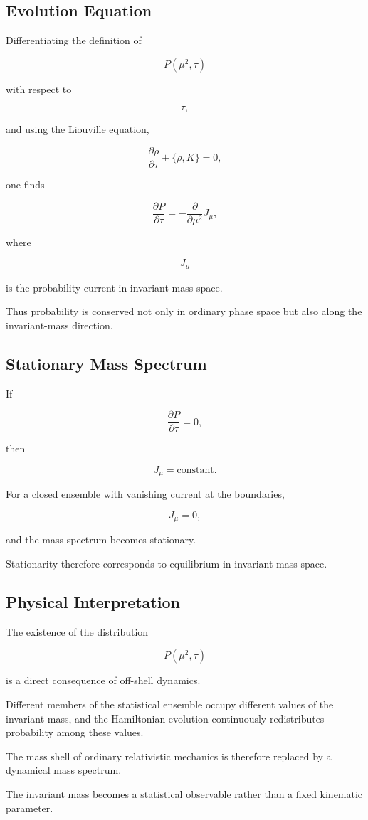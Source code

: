 \subsection{Evolution Equation}

Differentiating the definition of

\[
P(\mu^2,\tau)
\]

with respect to

\[
\tau,
\]

and using the Liouville equation,

\[
\frac{\partial\rho}{\partial\tau}
+
\{\rho,K\}
=
0,
\]

one finds

\[
\frac{\partial P}{\partial\tau}
=
-
\frac{\partial}{\partial\mu^2}
J_\mu,
\]

where

\[
J_\mu
\]

is the probability current in invariant-mass space.

Thus probability is conserved not only in ordinary phase space but also
along the invariant-mass direction.


\subsection{Stationary Mass Spectrum}

If

\[
\frac{\partial P}{\partial\tau}=0,
\]

then

\[
J_\mu
=
\text{constant}.
\]

For a closed ensemble with vanishing current at the boundaries,

\[
J_\mu=0,
\]

and the mass spectrum becomes stationary.

Stationarity therefore corresponds to equilibrium in invariant-mass
space.


\subsection{Physical Interpretation}

The existence of the distribution

\[
P(\mu^2,\tau)
\]

is a direct consequence of off-shell dynamics.

Different members of the statistical ensemble occupy different values of
the invariant mass, and the Hamiltonian evolution continuously
redistributes probability among these values.

The mass shell of ordinary relativistic mechanics is therefore replaced
by a dynamical mass spectrum.

The invariant mass becomes a statistical observable rather than a fixed
kinematic parameter.



